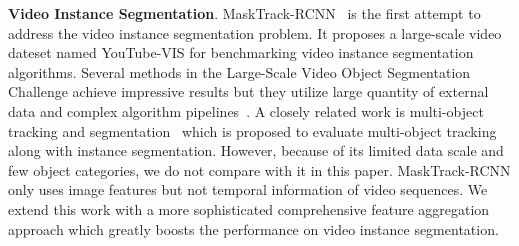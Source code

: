 \documentclass[letterpaper]{article} \usepackage{aaai21}  \usepackage{times}  \usepackage{helvet} \usepackage{courier}  \usepackage[hyphens]{url}  \usepackage{graphicx} \urlstyle{rm} \def\UrlFont{\rm}  \usepackage{natbib}  \usepackage{caption} \frenchspacing  \setlength{\pdfpagewidth}{8.5in}  \setlength{\pdfpageheight}{11in}  \newcommand{\etal}{\emph{et al. }}
\begin{document}
{\bf Video Instance Segmentation}. MaskTrack-RCNN~\cite{yang2019video} is the first attempt to address the video instance segmentation problem. It proposes a large-scale video dateset named YouTube-VIS for benchmarking video instance segmentation algorithms. Several methods in the Large-Scale Video Object Segmentation Challenge achieve impressive results but they utilize large quantity of external data and complex algorithm pipelines~\cite{wang2019empirical, dong2019temporal, luiten2019video}. A closely related work is multi-object tracking and segmentation~\cite{voigtlaender2019mots} which is proposed to evaluate multi-object tracking along with instance segmentation. However, because of its limited data scale and few object categories, we do not compare with it in this paper. MaskTrack-RCNN only uses image features but not temporal information of video sequences. We extend this work with a more sophisticated comprehensive feature aggregation approach which greatly boosts the performance on video instance segmentation.
\end{document}
